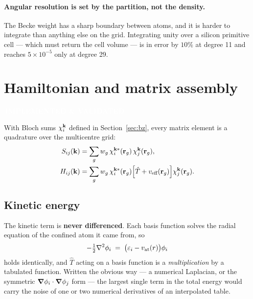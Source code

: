 \documentclass[11pt,a4paper]{article}
\newcommand{\badge}[2]{%
  \par\vspace{2pt}\noindent
  \colorbox{#1}{\textcolor{white}{\small\bfseries\,#2\,}}\par\vspace{4pt}}
\newcommand{\implemented}{\badge{okgreen}{IMPLEMENTED \& VALIDATED}}
\begin{document}
\paragraph{Angular resolution is set by the partition, not the density.}
The Becke weight has a sharp boundary between atoms, and it is harder to
integrate than anything else on the grid. Integrating unity over a silicon
primitive cell --- which must return the cell volume --- is in error by
$10\%$ at degree 11 and reaches $5\times10^{-5}$ only at degree 29.

\section{Hamiltonian and matrix assembly}
\label{sec:hamiltonian}
\implemented

With Bloch sums $\chi_i^{\vb{k}}$ defined in Section~\ref{sec:bz}, every
matrix element is a quadrature over the multicentre grid:
\begin{align}
  S_{ij}(\vb{k}) &= \sum_g w_g\, \chi_i^{\vb{k}*}(\vb{r}_g)\,
                                  \chi_j^{\vb{k}}(\vb{r}_g), \\
  H_{ij}(\vb{k}) &= \sum_g w_g\, \chi_i^{\vb{k}*}(\vb{r}_g)
                    \Bigl[ \hat{T} + v_{\text{eff}}(\vb{r}_g) \Bigr]
                    \chi_j^{\vb{k}}(\vb{r}_g).
\end{align}

\subsection{Kinetic energy}
\label{sec:kinetic}

The kinetic term is \textbf{never differenced}. Each basis function solves the
radial equation of the confined atom it came from, so
\begin{equation}
  -\tfrac12 \laplacian \phi_i \;=\; \bigl(\varepsilon_i - v_{\text{at}}(r)\bigr)\phi_i
  \label{eq:kinid}
\end{equation}
holds identically, and $\hat{T}$ acting on a basis function is a
\emph{multiplication} by a tabulated function. Written the obvious way --- a
numerical Laplacian, or the symmetric $\grad\phi_i \cdot \grad\phi_j$ form ---
the largest single term in the total energy would carry the noise of one or
two numerical derivatives of an interpolated table.
\end{document}
